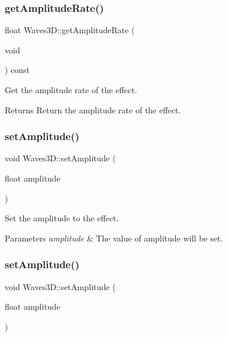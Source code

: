 \subsubsection{\texorpdfstring{get\+Amplitude\+Rate()}{getAmplitudeRate()}\hspace{0.1cm}{\footnotesize\ttfamily [2/2]}}
{\footnotesize\ttfamily float Waves3\+D\+::get\+Amplitude\+Rate (\begin{DoxyParamCaption}\item[{void}]{ }\end{DoxyParamCaption}) const\hspace{0.3cm}{\ttfamily [inline]}}



Get the amplitude rate of the effect. 

\begin{DoxyReturn}{Returns}
Return the amplitude rate of the effect. 
\end{DoxyReturn}
\mbox{\label{classWaves3D_a02f8620f2b45b47e5cb94c87f36674ac}} 
\subsubsection{\texorpdfstring{set\+Amplitude()}{setAmplitude()}\hspace{0.1cm}{\footnotesize\ttfamily [1/2]}}
{\footnotesize\ttfamily void Waves3\+D\+::set\+Amplitude (\begin{DoxyParamCaption}\item[{float}]{amplitude }\end{DoxyParamCaption})\hspace{0.3cm}{\ttfamily [inline]}}



Set the amplitude to the effect. 


\begin{DoxyParams}{Parameters}
{\em amplitude} & The value of amplitude will be set. \\
\hline
\end{DoxyParams}
\mbox{\label{classWaves3D_a02f8620f2b45b47e5cb94c87f36674ac}} 
\subsubsection{\texorpdfstring{set\+Amplitude()}{setAmplitude()}\hspace{0.1cm}{\footnotesize\ttfamily [2/2]}}
{\footnotesize\ttfamily void Waves3\+D\+::set\+Amplitude (\begin{DoxyParamCaption}\item[{float}]{amplitude }\end{DoxyParamCaption})\hspace{0.3cm}{\ttfamily [inline]}}



